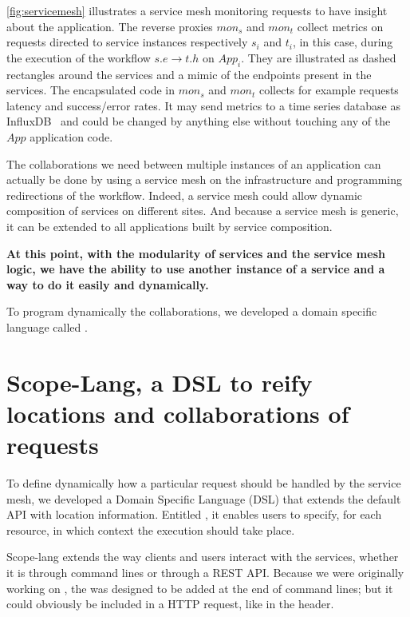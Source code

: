 \autoref{fig:servicemesh} illustrates a service mesh monitoring
requests to have insight about the application.
%
The reverse proxies $\mathit{mon_s}$ and $\mathit{mon_t}$ collect
metrics on requests directed to service instances respectively $s_i$
and $t_i$, in this case, during the execution of the workflow
$s.e \rightarrow t.h$ on $App_i$.
%
They are illustrated as dashed rectangles around the services and a
mimic of the endpoints present in the services.
%
The encapsulated code in $\mathit{mon_s}$ and $\mathit{mon_t}$
collects for example requests latency and success/error rates.
%
It may send metrics to a time series database as
InfluxDB~\cite{influxdb} and could be changed by anything else without
touching any of the $\mathit{App}$ application code.


The collaborations we need between multiple instances of an
application can actually be done by using a service mesh on the
infrastructure and programming redirections of the workflow.
%
Indeed, a service mesh could allow dynamic composition of services on
different sites.
%
And because a service mesh is generic, it can be extended to all
applications built by service composition.

\begin{tcolorbox}[colframe=CbTeal,colback=CbCyan]
\textbf{At this point, with the modularity of services and the service
  mesh logic, we have the ability to use another instance of a service
  and a way to do it easily and dynamically.}
\end{tcolorbox}

To program dynamically the collaborations, we developed a domain
specific language called \emph{\scl}.


\section{Scope-Lang, a DSL to reify locations and collaborations of
  requests}
\label{sec:scl}



To define dynamically how a particular request should be handled by
the service mesh, we developed a Domain Specific Language
(\acrshort{DSL}) that extends the default API with location
information.
%
Entitled \scl, it enables users to specify, for each resource, in
which context the execution should take place.
%

Scope-lang extends the way clients and users interact with the services,
whether it is through command lines or through a REST API.
%
Because we were originally working on \os, the \scl was designed to be
added at the end of command lines; but it could obviously be included
in a HTTP request, like in the header.

